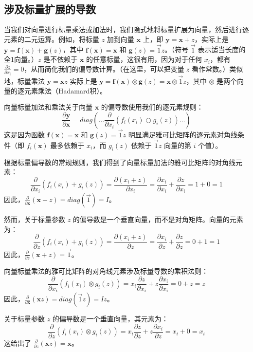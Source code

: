 \documentclass[11pt]{article}
\begin{document}
\subsection{涉及标量扩展的导数}\label{sec4.3}

当我们对向量进行标量乘法或加法时，我们隐式地将标量扩展为向量，然后进行逐元素的二元运算。例如，将标量 $z$ 加到向量 $\mathbf{x}$ 上，即 $\mathbf{y} = \mathbf{x} + z$，实际上是 $\mathbf{y} = \mathbf{f(x)} + \mathbf{g}(z)$，其中 $\mathbf{f(x)} = \mathbf{x}$ 和 $\mathbf{g}(z) = \vec{1} z$。（符号 $\vec{1}$ 表示适当长度的全1向量。）$z$ 是不依赖于 $\mathbf{x}$ 的任意标量，这很有用，因为对于任何 $x_i$，都有 $\frac{\partial z}{\partial x_i} = 0$，从而简化我们的偏导数计算。（在这里，可以把变量 $z$ 看作常数。）类似地，标量乘法 $\mathbf{y} = \mathbf{x} z$ 实际上是 $\mathbf{y} = \mathbf{f(x)} \otimes \mathbf{g}(z) = \mathbf{x} \otimes \vec{1}z$，其中 $\otimes$ 是两个向量的逐元素乘法（Hadamard积）。

向量标量加法和乘法关于向量 $\mathbf{x}$ 的偏导数使用我们的逐元素规则：
\[ \frac{\partial \mathbf{y}}{\partial \mathbf{x}} = diag \left( \ldots \frac{\partial}{\partial x_i} ( f_i(x_i) \bigcirc g_i(z) ) \ldots \right) \]
这是因为函数 $\mathbf{f(x)} = \mathbf{x}$ 和 $\mathbf{g}(z) = \vec{1} z$ 明显满足雅可比矩阵的逐元素对角线条件（即 $f_i(\mathbf{x})$ 最多依赖于 $x_i$，而 $g_i(z)$ 依赖于 $\vec{1}z$ 向量的第 $i$ 个值）。

根据标量偏导数的常规规则，我们得到了向量标量加法的雅可比矩阵的对角线元素：
\[ \frac{\partial}{\partial x_i} ( f_i(x_i) + g_i(z) ) = \frac{\partial (x_i + z)}{\partial x_i} = \frac{\partial x_i}{\partial x_i} + \frac{\partial z}{\partial x_i} = 1 + 0 = 1 \]
因此，$\frac{\partial}{\partial \mathbf{x}} ( \mathbf{x} + z ) = diag(\vec{1}) = I$。

然而，关于标量参数 $z$ 的偏导数是一个垂直向量，而不是对角矩阵。向量的元素为：
\[ \frac{\partial}{\partial z} ( f_i(x_i) + g_i(z) ) = \frac{\partial (x_i + z)}{\partial z} = \frac{\partial x_i}{\partial z} + \frac{\partial z}{\partial z} = 0 + 1 = 1 \]
因此，$\frac{\partial}{\partial z} ( \mathbf{x} + z ) = \vec{1}$。

向量标量乘法的雅可比矩阵的对角线元素涉及标量导数的乘积法则：
\[ \frac{\partial}{\partial x_i} ( f_i(x_i) \otimes g_i(z) ) = x_i  \frac{\partial z}{\partial x_i} + z  \frac{\partial x_i}{\partial x_i} = 0 + z = z \]
因此，$\frac{\partial}{\partial \mathbf{x}} ( \mathbf{x} z ) = diag(\vec{1}  z) = I z$。

关于标量参数 $z$ 的偏导数是一个垂直向量，其元素为：
\[ \frac{\partial}{\partial z} ( f_i(x_i) \otimes g_i(z) ) = x_i \frac{\partial z}{\partial z} + z \frac{\partial x_i}{\partial z} = x_i + 0 = x_i \]
这给出了 $\frac{\partial}{\partial z} ( \mathbf{x} z ) = \mathbf{x}$。
\end{document}
